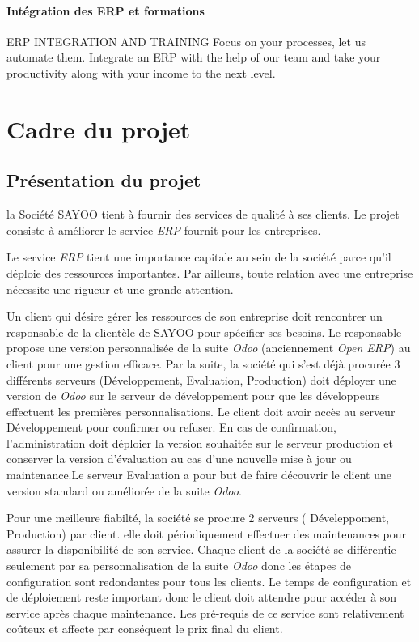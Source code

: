 \begin{onehalfspace}
\paragraph*{Intégration des ERP et formations}
ERP INTEGRATION AND TRAINING
Focus on your processes, let us automate them. Integrate an ERP with the help of our team and take your productivity along with your income to the next level.

\section{Cadre du projet}


\subsection{Présentation du projet}
 
la Société SAYOO tient à fournir des services de qualité à ses clients. Le projet consiste à améliorer le service \emph{ERP} fournit pour les entreprises.

Le service \emph{ERP} tient une importance capitale au sein de la société parce qu'il déploie des ressources importantes. Par ailleurs, toute relation avec une entreprise nécessite une rigueur et une grande attention.

Un client qui désire gérer les ressources de son entreprise  doit rencontrer un responsable de la clientèle de SAYOO pour spécifier ses besoins. Le responsable propose une version personnalisée de la suite \emph{Odoo} (anciennement \emph{Open ERP}) au client pour une gestion efficace. Par la suite, la société qui s'est déjà procurée  3 différents serveurs (Développement, Evaluation, Production) doit déployer une version de \emph{Odoo} sur le serveur de développement pour que les développeurs effectuent les premières personnalisations. Le client doit avoir accès au serveur Développement pour confirmer ou refuser. En cas de confirmation, l'administration doit déploier la version souhaitée sur le serveur production et conserver la version d'évaluation au cas d'une nouvelle mise à jour ou maintenance.Le serveur Evaluation a pour but de faire découvrir le client une version standard ou améliorée de la suite \emph{Odoo}.  

Pour une meilleure fiabilté, la société se procure 2 serveurs ( Déveleppoment, Production) par client. elle doit périodiquement effectuer des maintenances pour assurer la disponibilité de son service. Chaque client de la société se différentie seulement par sa personnalisation de la suite \emph{Odoo} donc les étapes de configuration sont redondantes pour tous les clients. Le temps de configuration et de déploiement reste important donc le client doit attendre pour accéder à son service après chaque maintenance. Les pré-requis de ce service sont relativement coûteux et affecte par conséquent le prix final du client.
  

















\end{onehalfspace}
